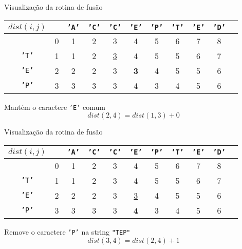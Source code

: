 \begin{frame}[fragile]{Visualização da rotina de fusão}

    \begin{table}
        \centering

        \begin{tabular}{c|cccccccccc} $dist(i, j)$ &
        & \textcolor{red!80!black}{\texttt{'A'}}
        & \textcolor{red!80!black}{\texttt{'C'}}
        & \textcolor{red!80!black}{\texttt{'C'}}
        & \textcolor{red!80!black}{\texttt{'E'}}
        & \textcolor{red!80!black}{\texttt{'P'}}
        & \textcolor{red!80!black}{\texttt{'T'}}
        & \textcolor{red!80!black}{\texttt{'E'}}
        & \textcolor{red!80!black}{\texttt{'D'}}\\
        \hline
&0 &1&2&3&4&5&6&7&8\\
\textcolor{red!80!black}{\texttt{'T'}}
&1 &1&2&\underline{3}&4&5&5&6&7\\
\textcolor{red!80!black}{\texttt{'E'}}
&2 &2&2&3&\textbf{3}&4&5&5&6\\
\textcolor{red!80!black}{\texttt{'P'}}
&3 &3&3&3&4&3&4&5&6\\
        \end{tabular}

    \end{table}

    Mantém o caractere
\textcolor{red!80!black}{\texttt{'E'}}
    comum
    \[
        dist(2, 4) = dist(1, 3) + 0
    \]    


\end{frame}

\begin{frame}[fragile]{Visualização da rotina de fusão}

    \begin{table}
        \centering

        \begin{tabular}{c|cccccccccc} $dist(i, j)$ &
        & \textcolor{red!80!black}{\texttt{'A'}}
        & \textcolor{red!80!black}{\texttt{'C'}}
        & \textcolor{red!80!black}{\texttt{'C'}}
        & \textcolor{red!80!black}{\texttt{'E'}}
        & \textcolor{red!80!black}{\texttt{'P'}}
        & \textcolor{red!80!black}{\texttt{'T'}}
        & \textcolor{red!80!black}{\texttt{'E'}}
        & \textcolor{red!80!black}{\texttt{'D'}}\\
        \hline
&0 &1&2&3&4&5&6&7&8\\
\textcolor{red!80!black}{\texttt{'T'}}
&1 &1&2&3&4&5&5&6&7\\
\textcolor{red!80!black}{\texttt{'E'}}
&2 &2&2&3&\underline{3}&4&5&5&6\\
\textcolor{red!80!black}{\texttt{'P'}}
&3 &3&3&3&\textbf{4}&3&4&5&6\\
        \end{tabular}

    \end{table}

    Remove o caractere
\textcolor{red!80!black}{\texttt{'P'}}
    na string 
\textcolor{red!80!black}{\texttt{"TEP"}}
    \[
        dist(3, 4) = dist(2, 4) + 1
    \]    


\end{frame}

